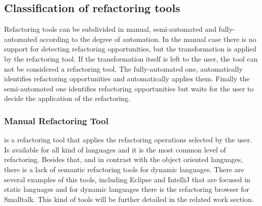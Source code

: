 \subsection{Classification of refactoring tools} %
Refactoring tools can be subdivided in manual, semi-automated and fully-automated according to the degree of automation.
In the manual case there is no support for detecting refactoring opportunities, but the transformation is applied by the refactoring tool. If the transformation itself is left to the user, the tool can not be considered a refactoring tool.
The fully-automated one, automatically identifies refactoring opportunities and automatically applies them.
Finally the semi-automated one identifies refactoring opportunities but waits for the user to decide the application of the refactoring.






\subsubsection{Manual Refactoring Tool}
is a refactoring tool that applies the refactoring operations selected by the user.
Is available for all kind of languages and it is the most common level of refactoring.
Besides that, and in contrast with the object oriented languages, there is a lack of semantic refactoring tools for dynamic languages.
There are several examples of this tools, including Eclipse and IntelliJ that are focused in static languages and for dynamic languages there is the refactoring browser for Smalltalk.
This kind of tools will be further detailed in the related work section.

